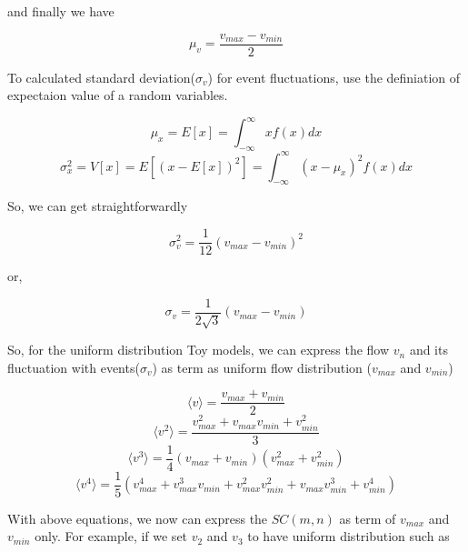 	and finally we have 
	
	\begin{equation}
		\mu_v = \frac{v_{max} - v_{min}}{2}
	\end{equation}
	\smallskip
	
	To calculated standard deviation($\sigma_v$) for event fluctuations, use the definiation of expectaion value of a random variables.
	
	\begin{equation}
		\mu_x = E[x] = \int_{-\infty}^{\infty}{xf(x)dx}
	\end{equation}
	\begin{equation}
		\sigma_x^2 = V[x] = E[(x-E[x])^2] = \int_{-\infty}^{\infty}{(x-\mu_x)^2 f(x) dx}
	\end{equation}
	\smallskip
	
	So, we can get straightforwardly
	
	\begin{equation}
		\sigma_v^2 = \frac{1}{12}(v_{max} - v_{min})^2
	\end{equation}
	
	or,
	
	\begin{equation}
		\sigma_v = \frac{1}{2\sqrt{3}}(v_{max} - v_{min})
	\end{equation}
	\smallskip
	
	
	So, for the uniform distribution Toy models, we can express the flow $v_n$ and its fluctuation with events($\sigma_v$) as term as uniform flow distribution ($v_{max}$ and $v_{min}$)
	
	\begin{equation}
		\langle v \rangle = \frac{v_{max} + v_{min}}{2}
	\end{equation}
	\begin{equation}
		\langle v^2 \rangle = \frac{v_{max}^2 + v_{max}v_{min} + v_{min}^2}{3}
	\end{equation}
	\begin{equation}
		\langle v^3 \rangle = \frac{1}{4} (v_{max} + v_{min})(v_{max}^2 + v_{min}^2 )
	\end{equation}	
	\begin{equation}
		\langle v^4 \rangle = \frac{1}{5}(v_{max}^4 + v_{max}^3v_{min} + v_{max}^2v_{min}^2 + v_{max}v_{min}^3 + v_{min}^4)
	\end{equation}
	\smallskip
	
	With above equations, we now can express the $SC(m,n)$ as term of $v_{max}$ and $v_{min}$ only. For example, if we set $v_2$ and $v_3$ to have uniform distribution such as
	
